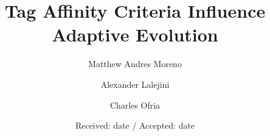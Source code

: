 







\title{Tag Affinity Criteria Influence Adaptive Evolution}
\author{
    Matthew Andres Moreno
	  \and Alexander Lalejini
    \and Charles Ofria \\
}

\date{Received: date / Accepted: date}

%
%

\makeatletter
\let\pragma@iinput=\@iinput
\def\@iinput#1{\xdef\@pragmafile{#1}\pragma@iinput{#1}}
\def\@pragmafile{default}
\def\pragmaonce{%
   \csname pragma@\@pragmafile\endcsname
   \global\expandafter\let \csname pragma@\@pragmafile\endcsname = \endinput
}
\makeatother





\maketitle



% 

% 
%
% 

\footnotesize


%
%
%
%
% 
%


